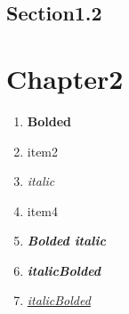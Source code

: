 \documentclass{report}
\begin{document}
    \section{Section1.2}

    \chapter{Chapter2}

    \begin{enumerate}
        \item \textbf{Bolded}
        \item item2
        \item \textit{italic}
        \item item4
        \item \textbf{\textit{Bolded italic}}
        \item \textit{\textbf{italicBolded}}
        \item \textit{\underline{italicBolded}}
    \end{enumerate}
\end{document}
